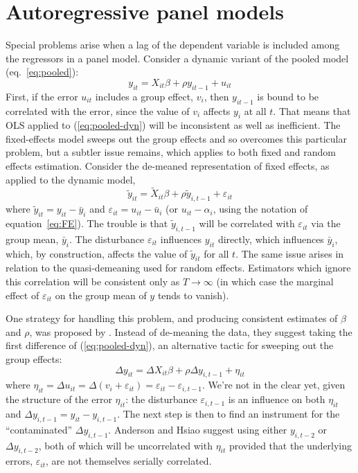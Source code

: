 \section{Autoregressive panel models}
\label{panel-auto}

Special problems arise when a lag of the dependent variable is
included among the regressors in a panel model.  Consider a dynamic
variant of the pooled model (eq.\ \ref{eq:pooled}):
\begin{equation}
\label{eq:pooled-dyn}
y_{it} = X_{it}\beta + \rho y_{it-1} + u_{it}
\end{equation}
First, if the error $u_{it}$ includes a group effect, $v_i$, then
$y_{it-1}$ is bound to be correlated with the error, since the value
of $v_i$ affects $y_i$ at all $t$.  That means that OLS applied to
(\ref{eq:pooled-dyn}) will be inconsistent as well as inefficient.
The fixed-effects model sweeps out the group effects and so overcomes
this particular problem, but a subtler issue remains, which applies to
both fixed and random effects estimation.  Consider the de-meaned
representation of fixed effects, as applied to the dynamic model,
\[
\tilde{y}_{it} = \tilde{X}_{it}\beta + \rho \tilde{y}_{i,t-1} 
  + \varepsilon_{it}
\]
where $\tilde{y}_{it} = y_{it} - \bar{y}_i$ and $\varepsilon_{it} =
u_{it} - \bar{u}_i$ (or $u_{it} - \alpha_i$, using the notation of
equation~\ref{eq:FE}).  The trouble is that $\tilde{y}_{i,t-1}$ will be
correlated with $\varepsilon_{it}$ via the group mean, $\bar{y}_i$.
The disturbance $\varepsilon_{it}$ influences $y_{it}$ directly, which
influences $\bar{y}_i$, which, by construction, affects the value of
$\tilde{y}_{it}$ for all $t$.  The same issue arises in relation to
the quasi-demeaning used for random effects.  Estimators which ignore
this correlation will be consistent only as $T \to \infty$ (in which
case the marginal effect of $\varepsilon_{it}$ on the group mean of 
$y$ tends to vanish).  

One strategy for handling this problem, and producing consistent
estimates of $\beta$ and $\rho$, was proposed by
\cite{anderson-hsiao81}.  Instead of de-meaning the data, they suggest
taking the first difference of (\ref{eq:pooled-dyn}), an alternative
tactic for sweeping out the group effects:
\begin{equation}
\label{eq:fe-dyn}
\Delta y_{it} = \Delta X_{it}\beta + \rho \Delta y_{i,t-1} 
  + \eta_{it}
\end{equation}
where $\eta_{it} = \Delta u_{it} = \Delta(v_i + \varepsilon_{it}) =
\varepsilon_{it} - \varepsilon_{i,t-1}$.  We're not in the clear yet,
given the structure of the error $\eta_{it}$: the disturbance
$\varepsilon_{i,t-1}$ is an influence on both $\eta_{it}$ and $\Delta
y_{i,t-1} = y_{it} - y_{i,t-1}$.  The next step is then to find an
instrument for the ``contaminated'' $\Delta y_{i,t-1}$. Anderson and
Hsiao suggest using either $y_{i,t-2}$ or $\Delta y_{i,t-2}$, both of
which will be uncorrelated with $\eta_{it}$ provided that the
underlying errors, $\varepsilon_{it}$, are not themselves serially
correlated.

